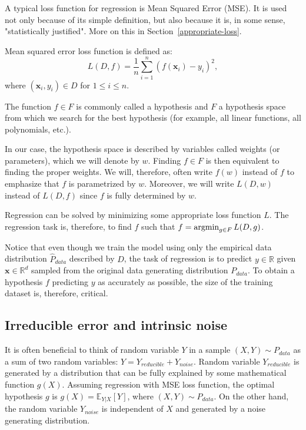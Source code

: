 A typical loss function for regression is Mean Squared Error (MSE). It is used not only because of its simple definition, but also because it is, in some sense, "statistically justified". More on this in Section~\ref{appropriate-loss}.

\begin{defn}\label{def01:5}
	Mean squared error loss function is defined as:
	\begin{equation}
	L(D, f) = \frac{1}{n} \sum_{i=1}^n (f(\textbf{x}_i) - y_i)^2,
	\end{equation}
	where $(\textbf{x}_i, y_i) \in D$ for $1 \leq i \leq n$.
\end{defn}

\begin{defn}\label{def01:4}
	The function $f \in F$ is commonly called a hypothesis and $F$ a hypothesis space from which we search for the best hypothesis (for example, all linear functions, all polynomials, etc.). 
\end{defn}

In our case, the hypothesis space is described by variables called weights (or parameters), which we will denote by $w$. Finding $f \in F$ is then equivalent to finding the proper weights. We will, therefore, often write $f(w)$ instead of $f$ to emphasize that $f$ is parametrized by $w$. Moreover, we will write $L(D, w)$ instead of $L(D, f)$ since $f$ is fully determined by $w$.

Regression can be solved by minimizing some appropriate loss function $L$. The regression task is, therefore, to find $f$ such that $f = \operatorname*{argmin}_{g \in F} L(D, g)$. 

Notice that even though we train the model using only the empirical data distribution $\hat{P}_{data}$ described by $D$, the task of regression is to predict $y \in \mathbb{R}$ given $\textbf{x} \in \mathbb{R}^d$ sampled from the original data generating distribution $P_{data}$. To obtain a hypothesis $f$ predicting $y$ as accurately as possible, the size of the training dataset is, therefore, critical.

\subsection{Irreducible error and intrinsic noise}


It is often beneficial to think of random variable $Y$ in a sample $(X, Y) \sim P_{data}$ as a sum of two random variables: $Y = Y_{reducible} + Y_{noise}$. Random variable $Y_{reducible}$ is generated by a distribution that can be fully explained by some mathematical function $g(X)$. Assuming regression with MSE loss function, the optimal hypothesis $g$ is $g(X) = \mathbb{E}_{Y|X}[Y]$, where $(X, Y) \sim P_{data}$. On the other hand, the random variable $Y_{noise}$ is independent of $X$ and generated by a noise generating distribution. 

